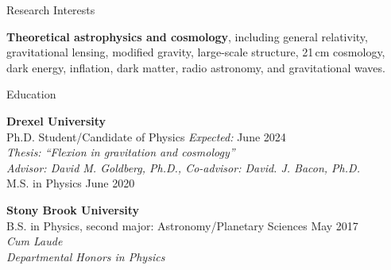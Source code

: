 \documentclass{resume} %
\begin{document}


\begin{rSection}{Research Interests}

\textbf{Theoretical astrophysics and cosmology}, including general relativity, gravitational lensing, modified gravity, large-scale structure, 21\,cm cosmology, dark energy, inflation, dark matter, radio astronomy, and gravitational waves. 

\end{rSection}


\begin{rSection}{Education}

\textbf{Drexel University} \\%
{\color{MidnightBlue} Ph.D.} Student/Candidate of Physics \hfill {\textit{Expected:} June 2024} \\
\textit{Thesis: ``Flexion in gravitation and cosmology''}\\
\textit{Advisor: David M. Goldberg, Ph.D., Co-advisor: David. J. Bacon, Ph.D.}\\
{\color{MidnightBlue} M.S.} in Physics \hfill{June 2020}%

\textbf{Stony Brook University} \\%
{\color{MidnightBlue} B.S.} in Physics, second major: Astronomy/Planetary Sciences \hfill{May 2017}\\%
\textit{Cum Laude}\\
\textit{Departmental Honors in Physics}

\end{rSection}

\end{document}
